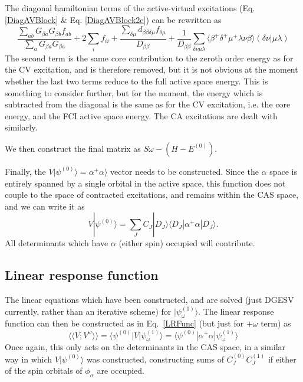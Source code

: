 \documentclass[a4paper,oneside,11pt]{article}
\numberwithin{equation}{section}
\begin{document}
The diagonal hamiltonian terms of the active-virtual excitations (Eq. \ref{DiagAVBlock} \& Eq. \ref{DiagAVBlock2e}) can be rewritten as
\begin{equation}
\frac{\sum_{ab} G_{\beta a} G_{\beta b} f_{ab}}{\sum_a G_{\beta a} G_{\beta a}} + 2 \sum_i f_{ii} + \frac{\sum_{\delta \mu} d_{\beta \beta \delta \mu} f_{\delta \mu}}{D_{\beta \beta}} + \frac{1}{D_{\beta \beta}} \sum_{\delta \nu \mu \lambda} \langle \beta^{+} \delta^{+} \mu^{+} \lambda \nu \beta \rangle (\delta \nu | \mu \lambda)
\end{equation}
The second term is the same core contribution to the zeroth order energy as for the CV excitation, and is therefore removed, but it is not obvious at the moment whether the last two terms reduce to 
the full active space energy. This is something to consider further, but for the moment, the energy which is subtracted from the diagonal is the same as for the CV excitation, i.e. the core energy, and the 
FCI active space energy. The CA excitations are dealt with similarly.

We then construct the final matrix as $S\omega - (H-E^{(0)})$.

Finally, the $V|\psi^{(0)} \rangle = \alpha^{+} \alpha \rangle$ vector needs to be constructed. 
Since the $\alpha$ space is entirely spanned by a single orbital in the active space, this function does not couple
to the space of contracted excitations, and remains within the CAS space, and we can write it as
\begin{equation}
V|\psi^{(0)} \rangle = \sum_J C_J |D_J \rangle \langle D_J | \alpha^{+} \alpha | D_J \rangle    .
\end{equation}
All determinants which have $\alpha$ (either spin) occupied will contribute.

\subsection{Linear response function}
The linear equations which have been constructed, and are solved (just DGESV currently, rather than an iterative scheme) for $|\psi^{(1)}_{\omega} \rangle$. The linear response function can then be
constructed as in Eq.~\ref{LRFunc} (but just for $+\omega$ term) as
\begin{equation}
\langle \langle V ; V^{\omega} \rangle \rangle = \langle \psi^{(0)} | V | \psi^{(1)}_{\omega} \rangle = \langle \psi^{(0)} | \alpha^{+} \alpha | \psi^{(1)}_{\omega} \rangle
\end{equation}
Once again, this only acts on the determinants in the CAS space, in a similar way in which $V|\psi^{(0)} \rangle$ was constructed, constructing sums of $C^{(0)}_J C^{(1)}_J$ if either of the spin orbitals
of $\phi_{\alpha}$ are occupied.
\end{document}
